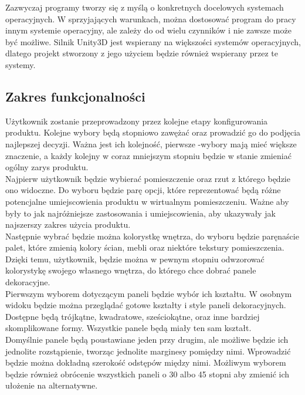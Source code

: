 \documentclass{article} %
\begin{document}
        Zazwyczaj programy tworzy się z myślą o konkretnych docelowych systemach operacyjnych. W sprzyjających warunkach, można dostosować program do pracy innym systemie operacyjny, ale zależy do od wielu czynników i nie zawsze może być możliwe. Silnik Unity3D jest wspierany na większości systemów operacyjnych, dlatego projekt stworzony z jego użyciem będzie również wspierany przez te systemy.
        \\
        
        
    \subsection{Zakres funkcjonalności}
        Użytkownik zostanie przeprowadzony przez kolejne etapy konfigurowania produktu. Kolejne wybory będą stopniowo zawężać oraz prowadzić go do podjęcia najlepszej decyzji. Ważna jest ich kolejność, pierwsze -wybory mają mieć większe znaczenie, a każdy kolejny w coraz mniejszym stopniu będzie w stanie zmieniać ogólny zarys produktu.
        \\
        
        Najpierw użytkownik będzie wybierać pomieszczenie oraz rzut z którego będzie ono widoczne. Do wyboru będzie parę opcji, które reprezentować będą różne potencjalne umiejscowienia produktu w wirtualnym pomieszczeniu. Ważne aby były to jak najróżniejsze zastosowania i umiejscowienia, aby ukazywały jak najszerszy zakres użycia produktu. 
        \\
        
        Następnie wybrać będzie można kolorystkę wnętrza, do wyboru będzie paręnaście palet, które zmienią kolory ścian, mebli oraz niektóre tekstury pomieszczenia. Dzięki temu, użytkownik, będzie można w pewnym stopniu odwzorować kolorystykę swojego własnego wnętrza, do którego chce dobrać panele dekoracyjne.
        \\
        
        Pierwszym wyborem dotyczącym paneli będzie wybór ich kształtu. W osobnym widoku będzie można przeglądać gotowe kształty i style paneli dekoracyjnych. Dostępne będą trójkątne, kwadratowe, sześciokątne, oraz inne bardziej skomplikowane formy. Wszystkie panele będą miały ten sam kształt.
        \\
        
        Domyślnie panele będą poustawiane jeden przy drugim, ale możliwe będzie ich jednolite rozstąpienie, tworząc jednolite marginesy pomiędzy nimi. Wprowadzić będzie można dokładną szerokość odstępów między nimi. Możliwym wyborem będzie również obrócenie wszystkich paneli o 30 albo 45 stopni aby zmienić ich ułożenie na alternatywne.
        \\
        
\end{document}
